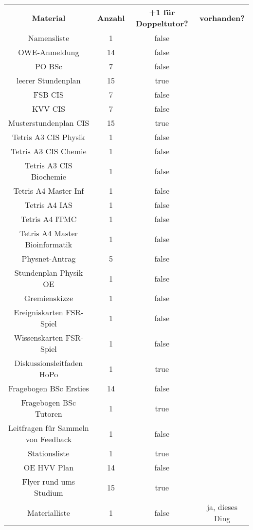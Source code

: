 \documentclass[10pt,a4paper,oneside,ngerman,numbers=noenddot]{scrartcl}
\begin{document}
	\begin{tabular}{c|c|c|c}
		\textbf{Material} & \textbf{Anzahl} & \textbf{+1 für Doppeltutor?} & \textbf{vorhanden?} \\
		\hline
		Namensliste & 1 & false & \\
		\hline
		OWE-Anmeldung & 14 & false & \\
		\hline
		PO BSc & 7 & false & \\
		\hline
		leerer Stundenplan & 15 & true & \\
		\hline
		FSB CIS & 7 & false & \\
		\hline
		KVV CIS & 7 & false & \\
		\hline
		Musterstundenplan CIS & 15 & true & \\
		\hline
		Tetris A3 CIS Physik & 1 & false & \\
		\hline
		Tetris A3 CIS Chemie & 1 & false & \\
		\hline
		Tetris A3 CIS Biochemie & 1 & false & \\
		\hline
		Tetris A4 Master Inf & 1 & false & \\
		\hline
		Tetris A4 IAS & 1 & false & \\
		\hline
		Tetris A4 ITMC & 1 & false & \\
		\hline
		Tetris A4 Master Bioinformatik & 1 & false & \\
		\hline
		Physnet-Antrag & 5 & false & \\
		\hline
		Stundenplan Physik OE & 1 & false & \\
		\hline
		Gremienskizze & 1 & false & \\
		\hline
		Ereigniskarten FSR-Spiel & 1 & false & \\
		\hline
		Wissenskarten FSR-Spiel & 1 & false & \\
		\hline
		Diskussionsleitfaden HoPo & 1 & true & \\
		\hline
		Fragebogen BSc Ersties & 14 & false & \\
		\hline
		Fragebogen BSc Tutoren & 1 & true & \\
		\hline
		Leitfragen für Sammeln von Feedback & 1 & false & \\
		\hline
		Stationsliste & 1 & true & \\
		\hline
		OE HVV Plan & 14 & false & \\
		\hline
		Flyer rund ums Studium & 15 & true & \\
		\hline
		Materialliste & 1 & false & ja, dieses Ding \\
	\end{tabular}
\end{document}

